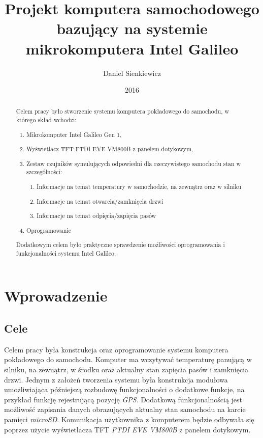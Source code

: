 \documentclass{xmgr}
\author   {Daniel Sienkiewicz}
\title    {Projekt komputera samochodowego bazujący na systemie mikrokomputera Intel Galileo}
\date     {2016}
\begin{document}
\begin{abstract}
Celem pracy było stworzenie systemu komputera pokładowego do samochodu, w którego skład wchodzi: 
\begin{enumerate}
	\item Mikrokomputer Intel Galileo Gen 1, 
	\item Wyświetlacz TFT FTDI EVE VM800B z panelem dotykowym, 
	\item Zestaw czujników symulujących odpowiedni dla rzeczywistego samochodu stan w szczególności:
	\begin{enumerate}
		\item Informacje na temat temperatury w samochodzie, na zewnątrz oraz w silniku
		\item Informacje na temat otwarcia/zamknięcia drzwi
		\item Informacje na temat odpięcia/zapięcia pasów
	\end{enumerate}
	\item Oprogramowanie
\end{enumerate}

Dodatkowym celem było praktyczne sprawdzenie możliwości oprogramowania i funkcjonalności systemu Intel Galileo.

\end{abstract}
\maketitle

\chapter{Wprowadzenie}
\section{Cele}
Celem pracy była konstrukcja oraz oprogramowanie systemu komputera pokładowego do samochodu. Komputer ma wczytywać temperaturę panującą w silniku, na zewnątrz, w środku oraz aktualny stan zapięcia pasów i zamknięcia drzwi. Jednym z założeń tworzenia systemu była konstrukcja modułowa umożliwiająca późniejszą rozbudowę funkcjonalności o dodatkowe funkcje, na przykład funkcję rejestrującą pozycję \emph{GPS}. Dodatkową funkcjonalnością jest możliwość zapisania danych obrazujących aktualny stan samochodu na karcie pamięci \emph{microSD}. Komunikacja użytkownika z komputerem będzie odbywała się poprzez użycie wyświetlacza TFT \emph{FTDI EVE VM800B} z panelem dotykowym.
\end{document}
